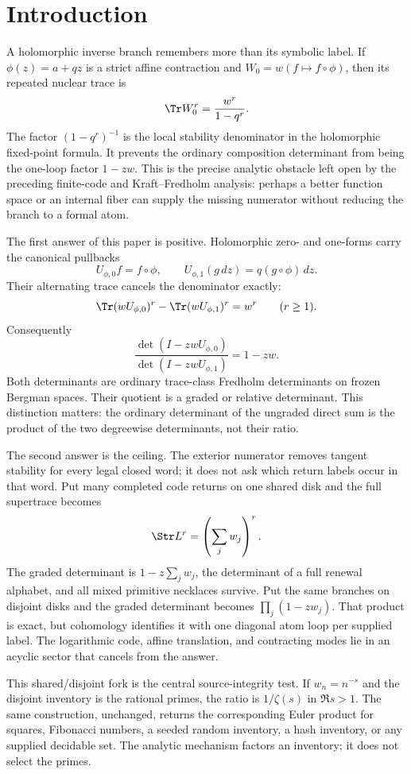 \section{Introduction}
\label{sec:introduction}

A holomorphic inverse branch remembers more than its symbolic label.  If
\(\phi(z)=a+qz\) is a strict affine contraction and
\(W_0=w(f\mapsto f\circ\phi)\), then its repeated nuclear trace is
\[
        \Tr W_0^r=\frac{w^r}{1-q^r}.
\]
The factor \((1-q^r)^{-1}\) is the local stability denominator in the
holomorphic fixed-point formula.  It prevents the ordinary composition
determinant from being the one-loop factor \(1-zw\).  This is the precise
analytic obstacle left open by the preceding finite-code and
Kraft--Fredholm analysis: perhaps a better function space or an internal
fiber can supply the missing numerator without reducing the branch to a
formal atom.

The first answer of this paper is positive.  Holomorphic zero- and one-forms
carry the canonical pullbacks
\[
 U_{\phi,0}f=f\circ\phi,
 \qquad
 U_{\phi,1}(g\,dz)=q(g\circ\phi)\,dz.
\]
Their alternating trace cancels the denominator exactly:
\[
 \Tr(wU_{\phi,0})^r-\Tr(wU_{\phi,1})^r=w^r
 \qquad(r\ge1).
\]
Consequently
\[
 \frac{\det(I-zwU_{\phi,0})}
      {\det(I-zwU_{\phi,1})}=1-zw.
\]
Both determinants are ordinary trace-class Fredholm determinants on frozen
Bergman spaces.  Their quotient is a graded or relative determinant.  This
distinction matters: the ordinary determinant of the ungraded direct sum is
the product of the two degreewise determinants, not their ratio.

The second answer is the ceiling.  The exterior numerator removes tangent
stability for every legal closed word; it does not ask which return labels
occur in that word.  Put many completed code returns on one shared disk and
the full supertrace becomes
\[
        \Str L^r=\left(\sum_jw_j\right)^r.
\]
The graded determinant is \(1-z\sum_jw_j\), the determinant of a full
renewal alphabet, and all mixed primitive necklaces survive.  Put the same
branches on disjoint disks and the graded determinant becomes
\(\prod_j(1-zw_j)\).  That product is exact, but cohomology identifies it
with one diagonal atom loop per supplied label.  The logarithmic code,
affine translation, and contracting modes lie in an acyclic sector that
cancels from the answer.

This shared/disjoint fork is the central source-integrity test.  If
\(w_n=n^{-s}\) and the disjoint inventory is the rational primes, the ratio
is \(1/\zeta(s)\) in \(\Re s>1\).  The same construction, unchanged, returns
the corresponding Euler product for squares, Fibonacci numbers, a seeded
random inventory, a hash inventory, or any supplied decidable set.  The
analytic mechanism factors an inventory; it does not select the primes.

